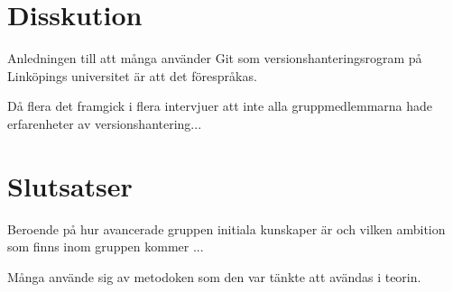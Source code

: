\section{Disskution}



Anledningen till att många använder Git som versionshanteringsrogram på Linköpings universitet är att det förespråkas.

Då flera det framgick i flera intervjuer att inte alla gruppmedlemmarna hade erfarenheter av versionshantering...

\section{Slutsatser}

Beroende på hur avancerade gruppen initiala kunskaper är och vilken ambition som finns inom gruppen kommer ...

Många använde sig av metodoken som den var tänkte att avändas i teorin.
